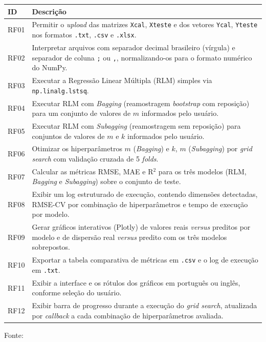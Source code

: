 \begin{quadro}[H]
\centering
\caption{Requisitos funcionais do sistema}
\label{qua:rf}
\begin{tabularx}{\textwidth}{|l|X|}
\hline
\textbf{ID} & \textbf{Descrição} \\ \hline
RF01 & Permitir o \textit{upload} das matrizes \texttt{Xcal}, \texttt{Xteste} e dos
vetores \texttt{Ycal}, \texttt{Yteste} nos formatos \texttt{.txt}, \texttt{.csv} e
\texttt{.xlsx}. \\ \hline
RF02 & Interpretar arquivos com separador decimal brasileiro (vírgula) e separador de
coluna \texttt{;} ou \texttt{,}, normalizando-os para o formato numérico do NumPy. \\
\hline
RF03 & Executar a Regressão Linear Múltipla (RLM) simples via \texttt{np.linalg.lstsq}.
\\ \hline
RF04 & Executar RLM com \textit{Bagging} (reamostragem \textit{bootstrap} com reposição)
para um conjunto de valores de $m$ informados pelo usuário. \\ \hline
RF05 & Executar RLM com \textit{Subagging} (reamostragem sem reposição) para conjuntos de
valores de $m$ e $k$ informados pelo usuário. \\ \hline
RF06 & Otimizar os hiperparâmetros $m$ (\textit{Bagging}) e $k$, $m$ (\textit{Subagging})
por \textit{grid search} com validação cruzada de 5 \textit{folds}. \\ \hline
RF07 & Calcular as métricas RMSE, MAE e R$^2$ para os três modelos (RLM, \textit{Bagging}
e \textit{Subagging}) sobre o conjunto de teste. \\ \hline
RF08 & Exibir um log estruturado de execução, contendo dimensões detectadas, RMSE-CV por
combinação de hiperparâmetros e tempo de execução por modelo. \\ \hline
RF09 & Gerar gráficos interativos (Plotly) de valores reais \textit{versus} preditos por
modelo e de dispersão real \textit{versus} predito com os três modelos sobrepostos. \\
\hline
RF10 & Exportar a tabela comparativa de métricas em \texttt{.csv} e o log de execução em
\texttt{.txt}. \\ \hline
RF11 & Exibir a interface e os rótulos dos gráficos em português ou inglês, conforme
seleção do usuário. \\ \hline
RF12 & Exibir barra de progresso durante a execução do \textit{grid search}, atualizada
por \textit{callback} a cada combinação de hiperparâmetros avaliada. \\ \hline
\end{tabularx}
\begin{tablenotes}[flushleft]
\footnotesize
\item Fonte:~\oautor
\end{tablenotes}
\end{quadro}

